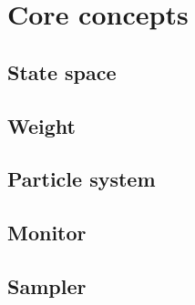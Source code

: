 \chapter{Core concepts}
\label{chap:Core concepts}

\section{State space}
\label{sec:State space}

\section{Weight}
\label{sec:Weight}

\section{Particle system}
\label{sec:Particle system}

\section{Monitor}
\label{sec:Monitor}

\section{Sampler}
\label{sec:Sampler}
